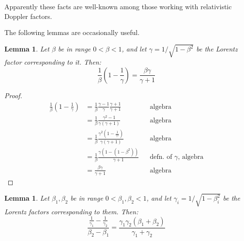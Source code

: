 \documentclass[a4paper]{article}
\theoremstyle{plain}
\newtheorem{lemma}[theorem]{Lemma}
\theoremstyle{definition}
\begin{document}
Apparently these facts are well-known among those working with
relativistic Doppler factors.

The following lemmas are occasionally useful.
\begin{lemma}
\label{lem:betaGammaIdentity1}
Let $\beta$ be in range $0 < \beta < 1$,
and let $\gamma = 1/\sqrt{1-\beta^2}$ be the Lorentz factor
corresponding to it.
Then:
\begin{equation}
\frac{1}{\beta} (1-\frac{1}{\gamma}) = \frac{\beta\gamma}{\gamma+1}
\end{equation}
\end{lemma}

\begin{proof}
\begin{align*}
\frac{1}{\beta} (1-\frac{1}{\gamma})
  & = \frac{1}{\beta} \frac{\gamma-1}{\gamma} \frac{\gamma+1}{\gamma+1} & & \text{algebra} \\
  & = \frac{1}{\beta} \frac{\gamma^2-1}{\gamma(\gamma+1)} & & \text{algebra} \\
  & = \frac{1}{\beta} \frac{\gamma^2(1-\frac{1}{\gamma^2})}{\gamma(\gamma+1)} & & \text{algebra} \\
  & = \frac{1}{\beta} \frac{\gamma(1-(1-\beta^2))}{\gamma+1} & & \text{defn. of $\gamma$, algebra} \\
  & = \frac{\beta\gamma}{\gamma+1} & & \text{algebra}
\end{align*}
\end{proof}

\begin{lemma}
\label{lem:betaGammaIdentity2}
Let $\beta_1, \beta_2$ be in range $0 < \beta_1, \beta_2 < 1$,
and let $\gamma_i = 1/\sqrt{1-\beta_i^2}$ be the Lorentz factors
corresponding to them.
Then:
\begin{equation}
\frac{\frac{1}{\gamma_1}-\frac{1}{\gamma_2}}{\beta_2-\beta_1}
  = \frac{\gamma_1\gamma_2(\beta_1+\beta_2)}{\gamma_1+\gamma_2}
\end{equation}
\end{lemma}
\end{document}
